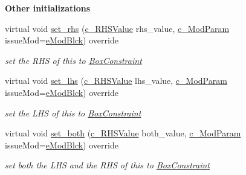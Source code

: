 \begin{Indent}\textbf{ Other initializations}\par
\begin{DoxyCompactItemize}
\item 
virtual void \mbox{\hyperlink{class_s_m_spp__di__unipi__it_1_1_box_constraint_a921fe527a5e01a2f6568c3d5d233380a}{set\+\_\+rhs}} (\mbox{\hyperlink{class_s_m_spp__di__unipi__it_1_1_row_constraint_a34abd4b01d3a2024be5f6d13dd88779f}{c\+\_\+\+R\+H\+S\+Value}} rhs\+\_\+value, \mbox{\hyperlink{group___modification___t_y_p_e_s_ga544246d8c462e9a2d817c2c30797968f}{c\+\_\+\+Mod\+Param}} issue\+Mod=\mbox{\hyperlink{group___modification___t_y_p_e_s_gga48fddcdd03a03f49b7e389ca1ed938d4a21b14b26b1c0093a0905f6fc010bad29}{e\+Mod\+Blck}}) override
\begin{DoxyCompactList}\small\item\em set the R\+HS of this to \mbox{\hyperlink{class_s_m_spp__di__unipi__it_1_1_box_constraint}{Box\+Constraint}} \end{DoxyCompactList}\item 
virtual void \mbox{\hyperlink{class_s_m_spp__di__unipi__it_1_1_box_constraint_a04d6bd47ee1aef8d3bfa2486b2732bd3}{set\+\_\+lhs}} (\mbox{\hyperlink{class_s_m_spp__di__unipi__it_1_1_row_constraint_a34abd4b01d3a2024be5f6d13dd88779f}{c\+\_\+\+R\+H\+S\+Value}} lhs\+\_\+value, \mbox{\hyperlink{group___modification___t_y_p_e_s_ga544246d8c462e9a2d817c2c30797968f}{c\+\_\+\+Mod\+Param}} issue\+Mod=\mbox{\hyperlink{group___modification___t_y_p_e_s_gga48fddcdd03a03f49b7e389ca1ed938d4a21b14b26b1c0093a0905f6fc010bad29}{e\+Mod\+Blck}}) override
\begin{DoxyCompactList}\small\item\em set the L\+HS of this to \mbox{\hyperlink{class_s_m_spp__di__unipi__it_1_1_box_constraint}{Box\+Constraint}} \end{DoxyCompactList}\item 
virtual void \mbox{\hyperlink{class_s_m_spp__di__unipi__it_1_1_box_constraint_a6f44fbb5f6b5aebd5f78d7593dc6e000}{set\+\_\+both}} (\mbox{\hyperlink{class_s_m_spp__di__unipi__it_1_1_row_constraint_a34abd4b01d3a2024be5f6d13dd88779f}{c\+\_\+\+R\+H\+S\+Value}} both\+\_\+value, \mbox{\hyperlink{group___modification___t_y_p_e_s_ga544246d8c462e9a2d817c2c30797968f}{c\+\_\+\+Mod\+Param}} issue\+Mod=\mbox{\hyperlink{group___modification___t_y_p_e_s_gga48fddcdd03a03f49b7e389ca1ed938d4a21b14b26b1c0093a0905f6fc010bad29}{e\+Mod\+Blck}}) override
\begin{DoxyCompactList}\small\item\em set both the L\+HS and the R\+HS of this to \mbox{\hyperlink{class_s_m_spp__di__unipi__it_1_1_box_constraint}{Box\+Constraint}} \end{DoxyCompactList}\end{DoxyCompactItemize}
\end{Indent}
